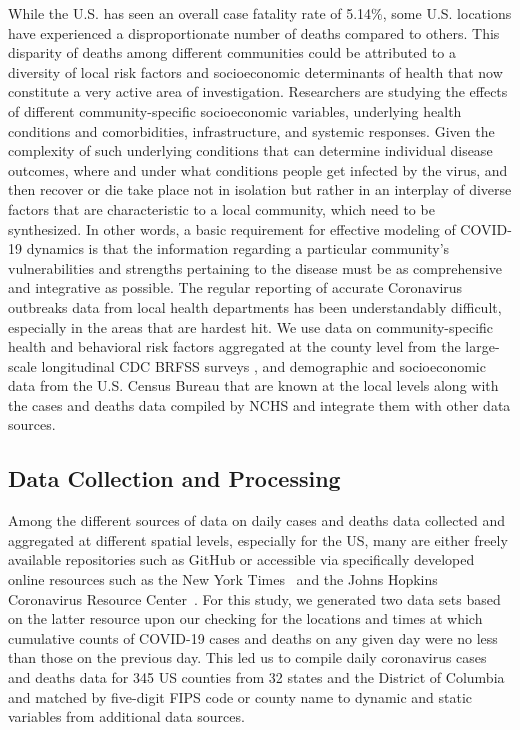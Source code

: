 \documentclass[12pt]{article}
\theoremstyle{definition}
\renewcommand{\_}{%
    \textunderscore\hspace{0pt}%
}
\begin{document}
While the U.S. has seen an overall case fatality rate of 5.14\%, 
some U.S. locations have experienced a disproportionate number of deaths compared to others. This disparity of deaths among different communities could be attributed to a diversity of local risk factors and socioeconomic determinants of health that now constitute a very active area of investigation. Researchers are studying the effects of different community-specific socioeconomic variables, underlying health conditions and comorbidities, infrastructure, and systemic responses.
Given the complexity of such underlying conditions that can determine individual disease outcomes,  where and under what conditions people get infected by the virus, and then recover or die take place not in isolation but rather in an interplay of diverse factors that are characteristic to a local community, which need to be synthesized. In other words, a basic requirement for effective modeling of COVID-19 dynamics is that the information regarding a particular community’s vulnerabilities and strengths pertaining to the disease must be as comprehensive and integrative as possible. 
The regular reporting of accurate Coronavirus outbreaks data from local health departments has been understandably difficult, especially in the areas that are hardest hit. We use data on community-specific health and behavioral risk factors aggregated at the county level from the large-scale longitudinal CDC BRFSS surveys \cite{www-cdc-brfss}, and demographic and socioeconomic data from the U.S. Census Bureau that are known at the local levels along with the cases and deaths data compiled by NCHS \cite{www-cdc-nchs} and integrate them with other data sources.

\subsection{Data Collection and Processing}

Among the different sources of data on daily cases and deaths data collected and aggregated at different spatial levels, especially for the US, many are either freely available repositories such as GitHub or accessible via specifically developed online resources such as the New York Times~\cite{github-nytimes} and the Johns Hopkins Coronavirus Resource Center~\cite{www-jh-covid19}. 
For this study, we generated two data sets based on the latter resource upon our checking for the locations and times at which cumulative counts of COVID-19 cases and deaths on any given day were no less than those on the previous day. This led us to compile daily coronavirus cases and deaths data for 345 US counties from 32 states and the District of Columbia and matched by five-digit FIPS code or county name to dynamic and static variables from additional data sources.
\end{document}
